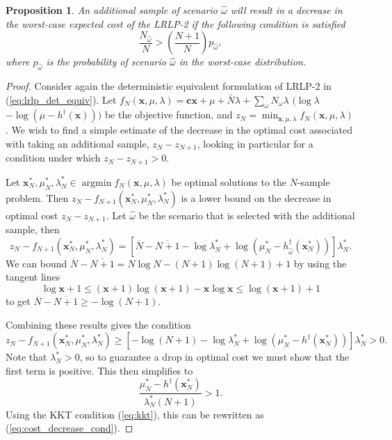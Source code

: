 \documentclass[11pt]{article}
\newcommand{\x}{\mathbf{x}}
\renewcommand{\c}{\mathbf{c}}
\DeclareMathOperator*{\argmin}{argmin}
\newtheorem{proposition}[theorem]{Proposition}
\begin{document}
\begin{proposition}
	An additional sample of scenario $\hat{\omega}$ will result in a decrease in the worst-case expected cost of the LRLP-2 if the following condition is satisfied
	\begin{equation} \label{eq:cost_decrease_cond}
		\frac{N_{\hat{\omega}}}{N} > \left( \frac{N+1}{N} \right) p_{\hat{\omega}},
	\end{equation}
	where $p_{\hat{\omega}}$ is the probability of scenario $\hat{\omega}$ in the worst-case distribution.
\end{proposition}

\begin{proof}
	Consider again the deterministic equivalent formulation of LRLP-2 in (\ref{eq:lrlp_det_equiv}).
	Let $f_N(\x,\mu,\lambda) =  \c\x + \mu + \bar{N}\lambda + \sum_\omega N_\omega\lambda$ $(\log\lambda$ $- \log(\mu-h^\dagger(\x)))$ be the objective function, and $z_N = \min_{\x,\mu,\lambda} f_N(\x,\mu,\lambda)$.
	We wish to find a simple estimate of the decrease in the optimal cost associated with taking an additional sample, $z_N - z_{N+1}$, looking in particular for a condition under which $z_N - z_{N+1} > 0$.

	Let $\x^*_N, \mu^*_N,\lambda^*_N \in \argmin f_N(\x,\mu,\lambda)$ be optimal solutions to the $N$-sample problem.
	Then $z_N - f_{N+1}(\x^*_N,\mu^*_N,\lambda^*_N)$ is a lower bound on the decrease in optimal cost $z_N - z_{N+1}$.
	Let $\hat{\omega}$ be the scenario that is selected with the additional sample, then
	\[
		z_N - f_{N+1}(\x^*_N,\mu^*_N,\lambda^*_N) = \left[ \overline{N} - \overline{N+1} - \log \lambda^*_N + \log(\mu^*_N - h^\dagger_{\hat{\omega}}(\x^*_N)) \right] \lambda^*_N.
	\]
	We can bound $\overline{N} - \overline{N+1} = N\log N - (N+1)\log(N+1) + 1$ by using the tangent lines
	\[
		\log \x + 1 \leq (\x+1)\log(\x+1) - \x\log \x \leq \log(\x+1) + 1
	\]
	to get $\overline{N} - \overline{N+1} \geq -\log(N+1)$.

	Combining these results gives the condition
	\[
		z_N - f_{N+1}(\x^*_N,\mu^*_N,\lambda^*_N) \geq \left[ -\log(N+1) - \log\lambda^*_N + \log(\mu^*_N-h^\dagger(\x^*_N))\right]\lambda^*_N > 0.
	\]
	Note that $\lambda^*_N > 0$, so to guarantee a drop in optimal cost we must show that the first term is positive.
	This then simplifies to
	\[
		\frac{\mu^*_N - h^\dagger(\x^*_N)}{\lambda^*_N(N+1)} > 1.
	\]
	Using the KKT condition (\ref{eq:kkt}), this can be rewritten as (\ref{eq:cost_decrease_cond}).
\end{proof}
\end{document}
